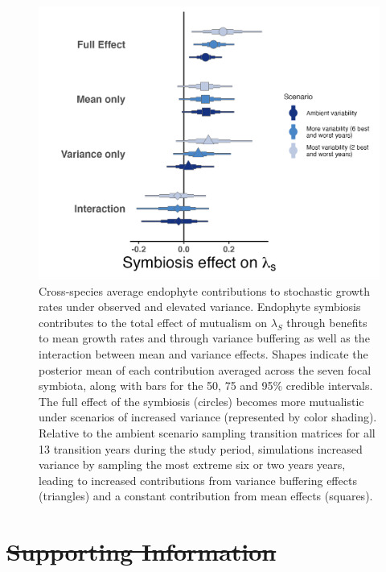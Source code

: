 \documentclass[lineno, sn-basic]{sn-jnl}%
\providecommand{\DIFdel}[1]{{\protect\color{red}\protect\scriptsize\sout{#1}}}
\providecommand{\DIFdel}[1]{{\protect\color{red}\sout{#1}}}                      %
\providecommand{\DIFaddbegin}{} %
\providecommand{\DIFaddend}{} %
\providecommand{\DIFdelbegin}{} %
\providecommand{\DIFdelend}{} %
\providecommand{\DIFaddbeginFL}{} %
\providecommand{\DIFaddendFL}{} %
\providecommand{\DIFdelbeginFL}{} %
\providecommand{\DIFdelendFL}{} %
\newcommand{\DIFscaledelfig}{0.5}
\newlength{\DIFdelgraphicswidth} %
\newlength{\DIFdelgraphicsheight} %
\newcommand{\DIFaddincludegraphics}[2][]{{\color{blue}\fbox{\DIFOincludegraphics[#1]{#2}}}} %
\newcommand{\DIFdelincludegraphics}[2][]{%
\sbox{\DIFdelgraphicsbox}{\DIFOincludegraphics[#1]{#2}}%
\settoboxwidth{\DIFdelgraphicswidth}{\DIFdelgraphicsbox} %
\settoboxtotalheight{\DIFdelgraphicsheight}{\DIFdelgraphicsbox} %
\scalebox{\DIFscaledelfig}{%
\parbox[b]{\DIFdelgraphicswidth}{\usebox{\DIFdelgraphicsbox}\\[-\baselineskip] \rule{\DIFdelgraphicswidth}{0em}}\llap{\resizebox{\DIFdelgraphicswidth}{\DIFdelgraphicsheight}{%
\setlength{\unitlength}{\DIFdelgraphicswidth}%
\begin{picture}(1,1)%
\thicklines\linethickness{2pt} %
{\color[rgb]{1,0,0}\put(0,0){\framebox(1,1){}}}%
{\color[rgb]{1,0,0}\put(0,0){\line( 1,1){1}}}%
{\color[rgb]{1,0,0}\put(0,1){\line(1,-1){1}}}%
\end{picture}%
}\hspace*{3pt}}} %
} %
\DeclareRobustCommand{\DIFaddbegin}{\DIFOaddbegin \let\includegraphics\DIFaddincludegraphics} %
\DeclareRobustCommand{\DIFaddend}{\DIFOaddend \let\includegraphics\DIFOincludegraphics} %
\DeclareRobustCommand{\DIFdelbegin}{\DIFOdelbegin \let\includegraphics\DIFdelincludegraphics} %
\DeclareRobustCommand{\DIFdelend}{\DIFOaddend \let\includegraphics\DIFOincludegraphics} %
\DeclareRobustCommand{\DIFaddbeginFL}{\DIFOaddbeginFL \let\includegraphics\DIFaddincludegraphics} %
\DeclareRobustCommand{\DIFaddendFL}{\DIFOaddendFL \let\includegraphics\DIFOincludegraphics} %
\DeclareRobustCommand{\DIFdelbeginFL}{\DIFOdelbeginFL \let\includegraphics\DIFdelincludegraphics} %
\DeclareRobustCommand{\DIFdelendFL}{\DIFOaddendFL \let\includegraphics\DIFOincludegraphics} %
\begin{document}
\begin{figure}
	\centering
	\DIFdelbeginFL %
\DIFdelendFL \DIFaddbeginFL \includegraphics[width=.8\linewidth]{StochDemo_newFig5.png}
	\caption[Cross-species average endophyte contributions to stochastic growth rates under observed and elevated variance]{\DIFaddendFL Cross-species average endophyte contributions to stochastic growth rates under observed and elevated variance. Endophyte symbiosis contributes to the total effect of mutualism on $\lambda_{S}$ through benefits to mean growth rates and through variance buffering as well as the interaction between mean and variance effects. Shapes indicate the posterior mean of each contribution averaged across the seven focal symbiota, along with bars for the 50, 75 and 95\% credible intervals.  The full effect of the symbiosis (circles) becomes more mutualistic under scenarios of increased variance (represented by color shading). Relative to the ambient scenario sampling transition matrices for all 13 transition years during the study period, simulations increased variance by sampling the most extreme six or two years years, leading to increased contributions from variance buffering effects (triangles) and a constant contribution from mean effects (squares).}
\end{figure}



\clearpage

\DIFdelbegin %
\DIFdelend \DIFaddbegin \appendix
\DIFaddend 


\DIFdelbegin \section*{\DIFdel{Supporting Information}}%
\DIFdelend \DIFaddbegin \setcounter{parttocdepth}{3}
\setcounter{secnumdepth}{-2}
\DIFaddend 
\end{document}
